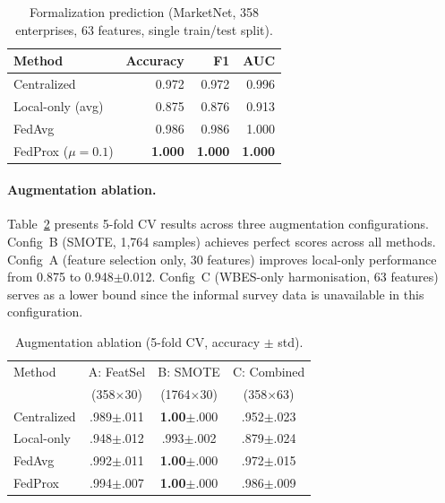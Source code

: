\documentclass{article}
\begin{document}
\begin{table}[t]
    \centering
    \caption{Formalization prediction (MarketNet, 358 enterprises, 63 features, single train/test split).}
    \label{tab:formal}
    \begin{tabular}{@{}lrrr@{}}
        \toprule
        Method & Accuracy & F1 & AUC \\
        \midrule
        Centralized & 0.972 & 0.972 & 0.996 \\
        Local-only (avg) & 0.875 & 0.876 & 0.913 \\
        FedAvg & 0.986 & 0.986 & 1.000 \\
        FedProx ($\mu{=}0.1$) & \textbf{1.000} & \textbf{1.000} & \textbf{1.000} \\
        \bottomrule
    \end{tabular}
\end{table}

\paragraph{Augmentation ablation.}
Table~\ref{tab:augment} presents 5-fold CV results across three augmentation configurations.
Config~B (SMOTE, 1,764 samples) achieves perfect scores across all methods.
Config~A (feature selection only, 30 features) improves local-only performance from 0.875 to 0.948$\pm$0.012.
Config~C (WBES-only harmonisation, 63 features) serves as a lower bound since the informal survey data is unavailable in this configuration.

\begin{table}[t]
    \centering
    \caption{Augmentation ablation (5-fold CV, accuracy $\pm$ std).}
    \label{tab:augment}
    \begin{tabular}{@{}lccc@{}}
        \toprule
        Method & A: FeatSel & B: SMOTE & C: Combined \\
        & (358$\times$30) & (1764$\times$30) & (358$\times$63) \\
        \midrule
        Centralized & .989$\pm$.011 & \textbf{1.00}$\pm$.000 & .952$\pm$.023 \\
        Local-only & .948$\pm$.012 & .993$\pm$.002 & .879$\pm$.024 \\
        FedAvg & .992$\pm$.011 & \textbf{1.00}$\pm$.000 & .972$\pm$.015 \\
        FedProx & .994$\pm$.007 & \textbf{1.00}$\pm$.000 & .986$\pm$.009 \\
        \bottomrule
    \end{tabular}
\end{table}
\end{document}
